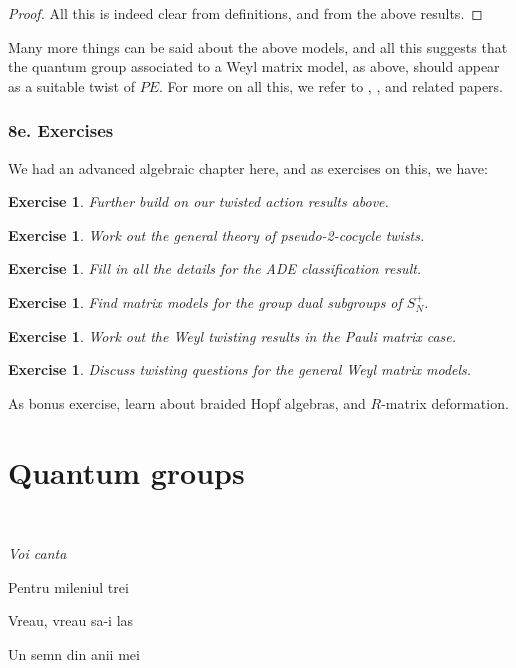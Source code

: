 \documentclass[12pt]{amsbook}
\newtheorem{exercise}[theorem]{Exercise}
\begin{document}
\begin{proof}
All this is indeed clear from definitions, and from the above results.
\end{proof}

Many more things can be said about the above models, and all this suggests that the quantum group associated to a Weyl matrix model, as above, should appear as a suitable twist of $PE$. For more on all this, we refer to \cite{bb1}, \cite{bco}, \cite{bne} and related papers.

\section*{8e. Exercises}

We had an advanced algebraic chapter here, and as exercises on this, we have:

\begin{exercise}
Further build on our twisted action results above.
\end{exercise}

\begin{exercise}
Work out the general theory of pseudo-2-cocycle twists.
\end{exercise}

\begin{exercise}
Fill in all the details for the ADE classification result.
\end{exercise}

\begin{exercise}
Find matrix models for the group dual subgroups of $S_N^+$.
\end{exercise}

\begin{exercise}
Work out the Weyl twisting results in the Pauli matrix case.
\end{exercise}

\begin{exercise}
Discuss twisting questions for the general Weyl matrix models.
\end{exercise}

As bonus exercise, learn about braided Hopf algebras, and $R$-matrix deformation.

\part{Quantum groups}

\ \vskip50mm

\begin{center}
{\em Voi canta 

Pentru mileniul trei

Vreau, vreau sa-i las 

Un semn din anii mei}
\end{center}
\end{document}
